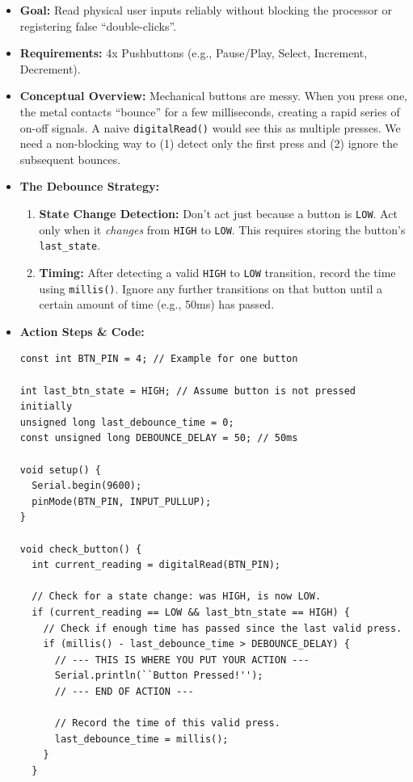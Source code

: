 \documentclass[11pt,a4paper]{article}
\begin{document}
\begin{itemize}
    \item \textbf{Goal:} Read physical user inputs reliably without blocking the processor or registering false ``double-clicks''.
    \item \textbf{Requirements:} 4x Pushbuttons (e.g., Pause/Play, Select, Increment, Decrement).
    \item \textbf{Conceptual Overview:} Mechanical buttons are messy. When you press one, the metal contacts ``bounce'' for a few milliseconds, creating a rapid series of on-off signals. A naive \verb|digitalRead()| would see this as multiple presses. We need a non-blocking way to (1) detect only the first press and (2) ignore the subsequent bounces.
    \item \textbf{The Debounce Strategy:}
    \begin{enumerate}
        \item \textbf{State Change Detection:} Don't act just because a button is \verb|LOW|. Act only when it \emph{changes} from \verb|HIGH| to \verb|LOW|. This requires storing the button's \verb|last_state|.
        \item \textbf{Timing:} After detecting a valid \verb|HIGH| to \verb|LOW| transition, record the time using \verb|millis()|. Ignore any further transitions on that button until a certain amount of time (e.g., 50ms) has passed.
    \end{enumerate}
    \item \textbf{Action Steps \& Code:}
\begin{lstlisting}[caption={Code for Module 4.2: A Robust Button Handler}]
const int BTN_PIN = 4; // Example for one button

int last_btn_state = HIGH; // Assume button is not pressed initially
unsigned long last_debounce_time = 0;
const unsigned long DEBOUNCE_DELAY = 50; // 50ms

void setup() {
  Serial.begin(9600);
  pinMode(BTN_PIN, INPUT_PULLUP);
}

void check_button() {
  int current_reading = digitalRead(BTN_PIN);

  // Check for a state change: was HIGH, is now LOW.
  if (current_reading == LOW && last_btn_state == HIGH) {
    // Check if enough time has passed since the last valid press.
    if (millis() - last_debounce_time > DEBOUNCE_DELAY) {
      // --- THIS IS WHERE YOU PUT YOUR ACTION ---
      Serial.println(``Button Pressed!'');
      // --- END OF ACTION ---

      // Record the time of this valid press.
      last_debounce_time = millis();
    }
  }
  

\end{lstlisting}
\end{itemize}
\end{document}
